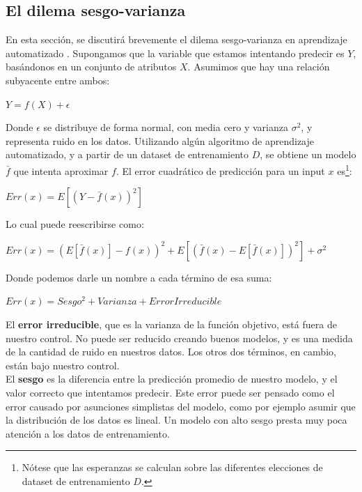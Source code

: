 \subsection{El dilema sesgo-varianza}

En esta sección, se discutirá brevemente el dilema sesgo-varianza en aprendizaje automatizado \cite{statisticallearning}. Supongamos que la variable que estamos intentando predecir es $Y$, basándonos en un conjunto de atributos $X$. Asumimos que hay una relación subyacente entre ambos:

\begin{center}
$Y = f(X) + \epsilon$
\end{center}

Donde $\epsilon$ se distribuye de forma normal, con media cero y varianza $\sigma^2$, y representa ruido en los datos. Utilizando algún algoritmo de aprendizaje automatizado, y a partir de un dataset de entrenamiento $D$, se obtiene un modelo $\bar{f}$ que intenta aproximar $f$. El error cuadrático de predicción para un input $x$ es\footnote{Nótese que las esperanzas se calculan sobre las diferentes elecciones de dataset de entrenamiento $D$.}:

\begin{center}
$Err(x) = E[(Y-\bar{f}(x))^2]$
\end{center}

Lo cual puede reescribirse como:

\begin{center}
$Err(x) = (E[\bar{f}(x)]-f(x))^2 + E[(\bar{f}(x)-E[\bar{f}(x)])^2] + \sigma^2$ 
\end{center}

Donde podemos darle un nombre a cada término de esa suma:

\begin{center}
$Err(x) =  Sesgo^2 + Varianza + Error Irreducible$
\end{center}



El \textbf{error irreducible}, que es la varianza de la función objetivo, está fuera de nuestro control. No puede ser reducido creando buenos modelos, y es una medida de la cantidad de ruido en nuestros datos. Los otros dos términos, en cambio, están bajo nuestro control.\\

El \textbf{sesgo} es la diferencia entre la predicción promedio de nuestro modelo, y el valor correcto que intentamos predecir. Este error puede ser pensado como el error causado por asunciones simplistas del modelo, como por ejemplo asumir que la distribución de los datos es lineal. Un modelo con alto sesgo presta muy poca atención a los datos de entrenamiento. \\

